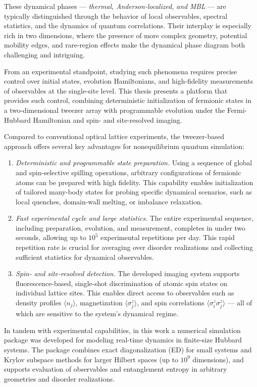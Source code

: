 These dynamical phases — \emph{thermal, Anderson-localized, and MBL} — are typically distinguished through the behavior of local observables, spectral statistics, and the dynamics of quantum correlations. Their interplay is especially rich in two dimensions, where the presence of more complex geometry, potential mobility edges, and rare-region effects make the dynamical phase diagram both challenging and intriguing.

From an experimental standpoint, studying such phenomena requires precise control over initial states, evolution Hamiltonians, and high-fidelity measurements of observables at the single-site level. This thesis presents a platform that provides such control, combining deterministic initialization of fermionic states in a two-dimensional tweezer array with programmable evolution under the Fermi-Hubbard Hamiltonian and spin- and site-resolved imaging.

Compared to conventional optical lattice experiments, the tweezer-based approach offers several key advantages for nonequilibrium quantum simulation:
\begin{enumerate}
	\item \textit{Deterministic and programmable state preparation.} Using a sequence of global and spin-selective spilling operations, arbitrary configurations of fermionic atoms can be prepared with high fidelity. This capability enables initialization of tailored many-body states for probing specific dynamical scenarios, such as local quenches, domain-wall melting, or imbalance relaxation.
	\item \textit{Fast experimental cycle and large statistics.} The entire experimental sequence, including preparation, evolution, and measurement, completes in under two seconds, allowing up to $10^5$ experimental repetitions per day. This rapid repetition rate is crucial for averaging over disorder realizations and collecting sufficient statistics for dynamical observables.
	\item \textit{Spin- and site-resolved detection.} The developed imaging system supports fluorescence-based, single-shot discrimination of atomic spin states on individual lattice sites. This enables direct access to observables such as density profiles $\langle n_j \rangle$, magnetization $\langle \sigma^z_j \rangle$, and spin correlations $\langle \sigma^z_i \sigma^z_j \rangle$ — all of which are sensitive to the system's dynamical regime.
\end{enumerate}

In tandem with experimental capabilities, in this work a numerical simulation package was developed for modeling real-time dynamics in finite-size Hubbard systems. The package combines exact diagonalization (ED) for small systems and Krylov subspace methods for larger Hilbert spaces (up to $10^9$ dimensions), and supports evaluation of observables and entanglement entropy in arbitrary geometries and disorder realizations.

